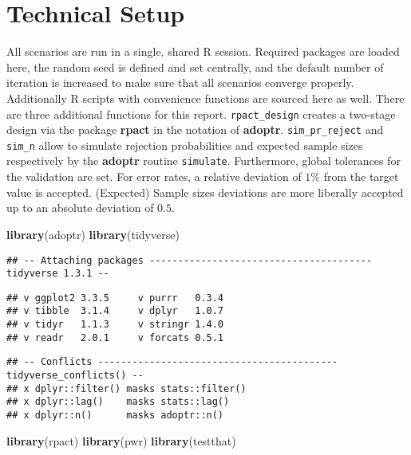 \documentclass[
]{book}
\newenvironment{Shaded}{\begin{snugshade}}{\end{snugshade}}
\newcommand{\KeywordTok}[1]{\textcolor[rgb]{0.13,0.29,0.53}{\textbf{#1}}}
\newcommand{\NormalTok}[1]{#1}
\begin{document}
\hypertarget{technical-setup}{%
\section{Technical Setup}\label{technical-setup}}

All scenarios are run in a single, shared R session.
Required packages are loaded here,
the random seed is defined and set centrally, and the default number
of iteration is increased to make sure that all scenarios
converge properly.
Additionally R scripts with convenience functions are sourced here as well.
There are three additional functions for this report.
\texttt{rpact\_design} creates a two-stage design via the package \textbf{rpact} \citep{R-rpact}
in the notation of \textbf{adoptr}.
\texttt{sim\_pr\_reject} and \texttt{sim\_n} allow to simulate rejection probabilities
and expected sample sizes respectively by the \textbf{adoptr} routine \texttt{simulate}.
Furthermore, global tolerances for the validation are set.
For error rates, a relative deviation of \(1\%\) from the target value is
accepted.
(Expected) Sample sizes deviations are more liberally accepted up to an
absolute deviation of \(0.5\).

\begin{Shaded}
\begin{Highlighting}[]
\KeywordTok{library}\NormalTok{(adoptr)}
\KeywordTok{library}\NormalTok{(tidyverse)}
\end{Highlighting}
\end{Shaded}

\begin{verbatim}
## -- Attaching packages --------------------------------------- tidyverse 1.3.1 --
\end{verbatim}

\begin{verbatim}
## v ggplot2 3.3.5     v purrr   0.3.4
## v tibble  3.1.4     v dplyr   1.0.7
## v tidyr   1.1.3     v stringr 1.4.0
## v readr   2.0.1     v forcats 0.5.1
\end{verbatim}

\begin{verbatim}
## -- Conflicts ------------------------------------------ tidyverse_conflicts() --
## x dplyr::filter() masks stats::filter()
## x dplyr::lag()    masks stats::lag()
## x dplyr::n()      masks adoptr::n()
\end{verbatim}

\begin{Shaded}
\begin{Highlighting}[]
\KeywordTok{library}\NormalTok{(rpact)}
\KeywordTok{library}\NormalTok{(pwr)}
\KeywordTok{library}\NormalTok{(testthat)}
\end{Highlighting}
\end{Shaded}
\end{document}
